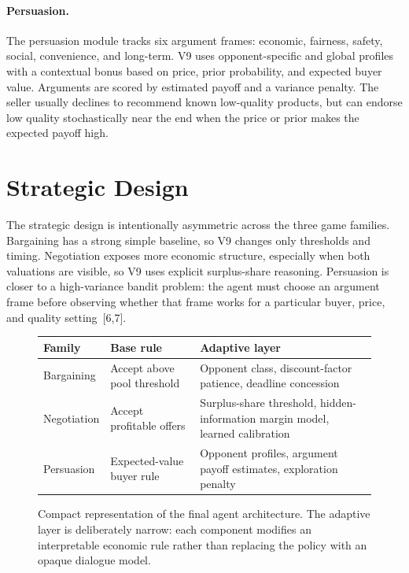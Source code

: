 \documentclass{article}
\begin{document}
\paragraph{Persuasion.}
The persuasion module tracks six argument frames: economic, fairness, safety, social, convenience, and long-term. V9 uses opponent-specific and global profiles with a contextual bonus based on price, prior probability, and expected buyer value. Arguments are scored by estimated payoff and a variance penalty. The seller usually declines to recommend known low-quality products, but can endorse low quality stochastically near the end when the price or prior makes the expected payoff high.

\section{Strategic Design}

The strategic design is intentionally asymmetric across the three game families. Bargaining has a strong simple baseline, so V9 changes only thresholds and timing. Negotiation exposes more economic structure, especially when both valuations are visible, so V9 uses explicit surplus-share reasoning. Persuasion is closer to a high-variance bandit problem: the agent must choose an argument frame before observing whether that frame works for a particular buyer, price, and quality setting~[6,7].

\begin{figure}[t]
\centering
\small
\begin{tabular}{>{\raggedright\arraybackslash}p{1.05in}>{\raggedright\arraybackslash}p{1.25in}p{2.95in}}
\toprule
Family & Base rule & Adaptive layer \\
\midrule
Bargaining & Accept above pool threshold & Opponent class, discount-factor patience, deadline concession \\
Negotiation & Accept profitable offers & Surplus-share threshold, hidden-information margin model, learned calibration \\
Persuasion & Expected-value buyer rule & Opponent profiles, argument payoff estimates, exploration penalty \\
\bottomrule
\end{tabular}
\caption{Compact representation of the final agent architecture. The adaptive layer is deliberately narrow: each component modifies an interpretable economic rule rather than replacing the policy with an opaque dialogue model.}
\label{fig:architecture}
\end{figure}
\end{document}
